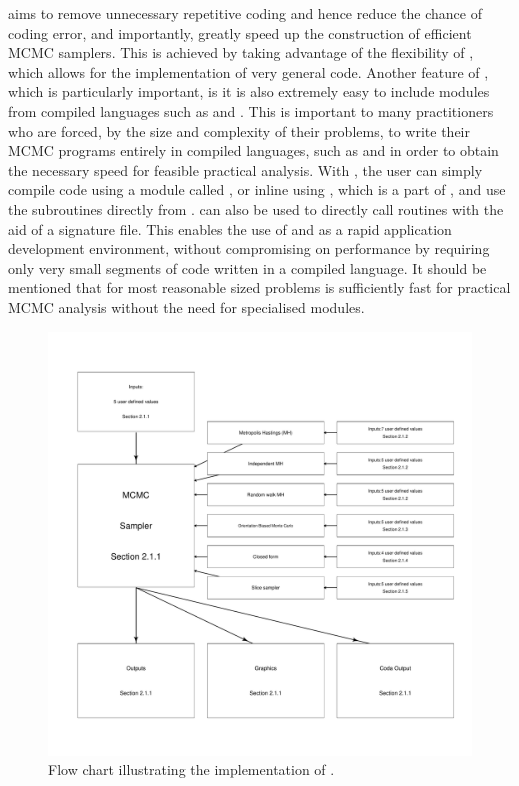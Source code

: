 \documentclass[article]{jss}
\begin{document}
 aims to remove unnecessary repetitive coding and hence
reduce the chance of coding error, and importantly, greatly speed up
the construction of efficient MCMC samplers. This is achieved by
taking advantage of the flexibility of , which allows
for the implementation of very general code. Another feature of
, which is particularly important, is it is also
extremely easy to include modules from compiled languages such as
 and . This is important to many
practitioners who are forced, by the size and complexity of their
problems, to write their MCMC programs entirely in compiled languages,
such as  and  in order to obtain the
necessary speed for feasible practical analysis. With
, the user can simply compile  code
using a module called  \citep{F2PY}, or inline 
using , which is a part of  \citep{NumpyScipy},
and use the subroutines directly from . 
can also be used to directly call  routines with the aid
of a  signature file. This enables the use of
 and  as a rapid application development
environment, without compromising on performance by requiring only very
small segments of code written in a compiled language. It should be
mentioned that for most reasonable sized problems  is
sufficiently fast for practical MCMC analysis without the need for
specialised modules.

%
\begin{figure}[t!]
  \begin{center}
\hspace*{-1cm}\includegraphics[width=18cm]{flowchart.pdf}    
\end{center}
\caption{Flow chart illustrating the implementation of
  .\label{fig:Flow-chart-ofPyMCMC}}

\end{figure}
\end{document}
